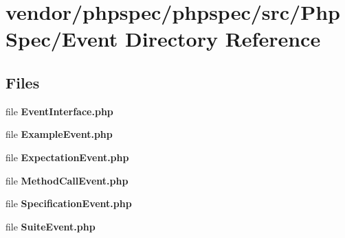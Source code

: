 \section{vendor/phpspec/phpspec/src/\+Php\+Spec/\+Event Directory Reference}
\label{dir_a2d54cf7a0c92df3c7497ba464220d98}
\subsection*{Files}
\begin{DoxyCompactItemize}
\item 
file {\bf Event\+Interface.\+php}
\item 
file {\bf Example\+Event.\+php}
\item 
file {\bf Expectation\+Event.\+php}
\item 
file {\bf Method\+Call\+Event.\+php}
\item 
file {\bf Specification\+Event.\+php}
\item 
file {\bf Suite\+Event.\+php}
\end{DoxyCompactItemize}
